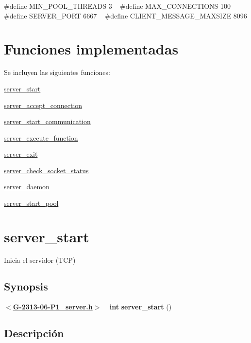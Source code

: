 {\ttfamily  \#define M\+I\+N\+\_\+\+P\+O\+O\+L\+\_\+\+T\+H\+R\+E\+A\+DS 3 ~\newline
\#define M\+A\+X\+\_\+\+C\+O\+N\+N\+E\+C\+T\+I\+O\+NS 100 ~\newline
\#define S\+E\+R\+V\+E\+R\+\_\+\+P\+O\+RT 6667 ~\newline
\#define C\+L\+I\+E\+N\+T\+\_\+\+M\+E\+S\+S\+A\+G\+E\+\_\+\+M\+A\+X\+S\+I\+ZE 8096 }\hypertarget{server_connection_functions}{}\section{Funciones implementadas}\label{server_connection_functions}
Se incluyen las siguientes funciones\+: 
\begin{DoxyItemize}
\item \hyperlink{server_start}{server\+\_\+start} 
\item \hyperlink{server_accept_connection}{server\+\_\+accept\+\_\+connection} 
\item \hyperlink{server_start_communication}{server\+\_\+start\+\_\+communication} 
\item \hyperlink{server_execute_function}{server\+\_\+execute\+\_\+function} 
\item \hyperlink{server_exit}{server\+\_\+exit} 
\item \hyperlink{server_check_socket_status}{server\+\_\+check\+\_\+socket\+\_\+status} 
\item \hyperlink{server_daemon}{server\+\_\+daemon} 
\item \hyperlink{server_start_pool}{server\+\_\+start\+\_\+pool} 
\end{DoxyItemize}\hypertarget{server_start}{}\section{server\+\_\+start}\label{server_start}
Inicia el servidor (T\+CP)\hypertarget{server_start_synopsis2}{}\subsection{Synopsis}\label{server_start_synopsis2}
{ {\bfseries $<$\hyperlink{G-2313-06-P1__server_8h}{G-\/2313-\/06-\/\+P1\+\_\+server.\+h}$>$} ~\newline
 {\bfseries int} {\bfseries server\+\_\+start} {\bfseries }() } \hypertarget{server_start_descripcion2}{}\subsection{Descripción}\label{server_start_descripcion2}
